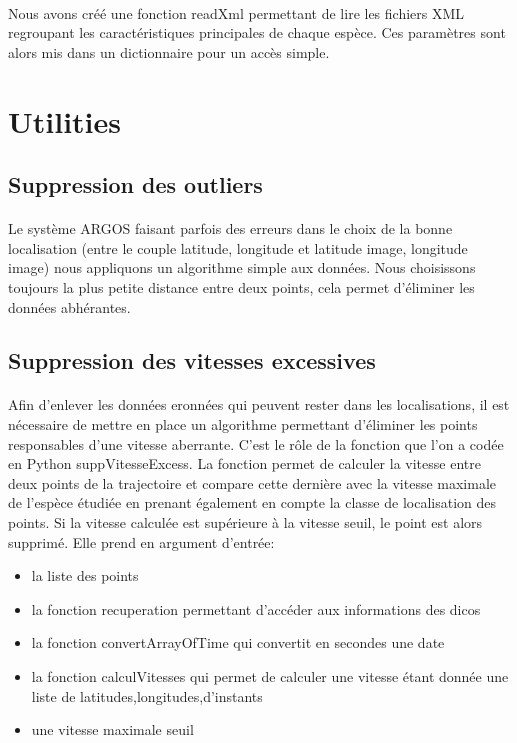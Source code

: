 \documentclass[11p, a4papert]{article}
\begin{document}
\paragraph{}
Nous avons créé une fonction readXml permettant de lire les fichiers XML regroupant les caractéristiques principales de chaque espèce. Ces paramètres sont alors mis dans un dictionnaire pour un accès simple.

\section{Utilities}
\subsection{Suppression des outliers}
\paragraph{}
Le système ARGOS faisant parfois des erreurs dans le choix de la bonne localisation (entre le couple latitude, longitude et latitude image, longitude image) nous appliquons un algorithme simple aux données. Nous choisissons toujours la plus petite distance entre deux points, cela permet d'éliminer les données abhérantes.

\subsection{Suppression des vitesses excessives}
\paragraph{}
Afin d'enlever les données eronnées qui peuvent rester dans les localisations, il est nécessaire de mettre en place un algorithme permettant d'éliminer les points responsables d'une vitesse aberrante. C'est le rôle de la fonction que l'on a codée en Python suppVitesseExcess. La fonction permet de calculer la vitesse entre deux points de la trajectoire et compare cette dernière avec la vitesse maximale de l'espèce étudiée en prenant également en compte la classe de localisation des points. Si la vitesse calculée est supérieure à la vitesse seuil, le point est alors supprimé. 
Elle prend en argument d'entrée:

\begin{itemize}
\item la liste des points
\item la fonction recuperation permettant d'accéder aux informations des dicos
\item la fonction convertArrayOfTime qui convertit en secondes une date
\item la fonction calculVitesses qui permet de calculer une vitesse étant donnée une liste de latitudes,longitudes,d'instants
\item une vitesse maximale seuil
\end{itemize}
\newpage
\end{document}
